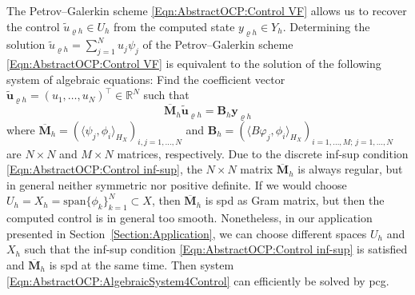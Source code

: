 \documentclass{article}
\numberwithin{equation}{section}
\begin{document}
The Petrov--Galerkin scheme \eqref{Eqn:AbstractOCP:Control VF} allows us
to recover the control  $\widetilde{u}_{\varrho h} \in U_h$  from the computed
state $y_{\varrho h} \in Y_h$. Determining the solution 
$\widetilde{u}_{\varrho h} = \sum_{j=1}^N u_j \psi_j$ of the
Petrov--Galerkin scheme \eqref{Eqn:AbstractOCP:Control VF} is equivalent to
the solution of the following system of algebraic equations: 
Find the coefficient vector
$\widetilde{\mathbf u}_{\varrho h} = (u_1,\ldots,u_N)^\top \in \mathbb{R}^N$
such that
\begin{equation}\label{Eqn:AbstractOCP:AlgebraicSystem4Control}
  \overline{\mathbf M}_h \widetilde{\mathbf u}_{\varrho h} =
  {\mathbf B}_h{\mathbf y}_{\varrho h}
\end{equation}
where $\overline{\mathbf M}_h =
(\langle \psi_j , \phi_i \rangle_{H_X})_{i,j=1,\ldots,N}$ and 
${\mathbf B}_h = (\langle B \varphi_j , \phi_i \rangle_{H_X}
)_{i=1,\ldots,M;\,j=1,\ldots,N}$ are $N \times N$ and $M \times N$ matrices,
respectively. Due to the discrete inf-sup condition
\eqref{Eqn:AbstractOCP:Control inf-sup}, the $N \times N$ matrix
$\overline{\mathbf M}_h$ is always regular, but in general neither symmetric
nor positive definite. If we would choose
$U_h = X_h = \mbox{span} \{ \phi_k \}_{k=1}^N \subset X$, then
$\overline{\mathbf M}_h$ is spd as Gram matrix, but then the computed
control is in general too smooth. Nonetheless, in our application presented
in Section~\ref{Section:Application}, we can choose different spaces $U_h$
and $X_h$ such that the inf-sup condition
\eqref{Eqn:AbstractOCP:Control inf-sup} is satisfied
and $\overline{\mathbf M}_h$ is spd at the same time.
Then system \eqref{Eqn:AbstractOCP:AlgebraicSystem4Control} can efficiently be 
solved by pcg. 
\end{document}
